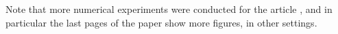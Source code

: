 Note that more numerical experiments were conducted for the article \cite{Besson2018ALT}, and in particular the last pages of the paper show more figures, in other settings.

